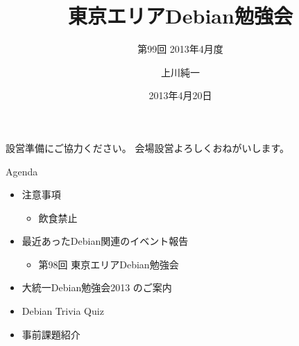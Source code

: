 \title{東京エリアDebian勉強会}
\subtitle{第99回 2013年4月度}
\author{上川純一}
\date{2013年4月20日}



\frame{\titlepage{}}

\begin{frame}{設営準備にご協力ください。}
会場設営よろしくおねがいします。
\end{frame}

\begin{frame}{Agenda}
\begin{minipage}[t]{0.45\hsize}
  \begin{itemize}
  \item 注意事項
	\begin{itemize}
	 \item 飲食禁止
	\end{itemize}
 \end{itemize}
\end{minipage} 
\begin{minipage}[t]{0.45\hsize}
 \begin{itemize}
   \item 最近あったDebian関連のイベント報告
	\begin{itemize}
        \item 第98回 東京エリアDebian勉強会
	\end{itemize}
  \item 大統一Debian勉強会2013 のご案内
  \item Debian Trivia Quiz
  \item 事前課題紹介
 \end{itemize}
\end{minipage}
\end{frame}

